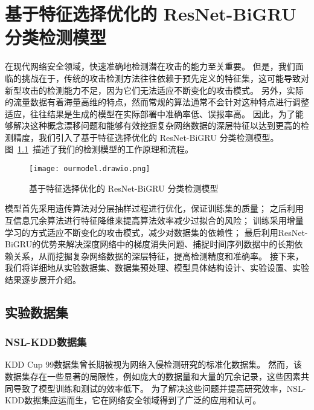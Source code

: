 \chapter{基于特征选择优化的 ResNet-BiGRU 分类检测模型}
\label{cha:ResNet-BiGRU}

在现代网络安全领域，快速准确地检测潜在攻击的能力至关重要。
但是，我们面临的挑战在于，传统的攻击检测方法往往依赖于预先定义的特征集，这可能导致对新型攻击的检测能力不足，因为它们无法适应不断变化的攻击模式。
另外，实际的流量数据有着海量高维的特点，然而常规的算法通常不会针对这种特点进行调整适应，往往结果是生成的模型在实际部署中准确率低、误报率高。
因此，为了能够解决这种概念漂移问题和能够有效挖掘复杂网络数据的深层特征以达到更高的检测精度，我们引入了基于特征选择优化的 ResNet-BiGRU 分类检测模型。
图~\ref{fig:attack_detecion_model}~描述了我们的检测模型的工作原理和流程。
\begin{figure}[htbp]
  \centering
  \texttt{[image: ourmodel.drawio.png]}
  \caption{基于特征选择优化的 ResNet-BiGRU 分类检测模型}
  \label{fig:attack_detecion_model}
\end{figure}


模型首先采用遗传算法对分层抽样过程进行优化，保证训练集的质量；
之后利用互信息冗余算法进行特征降维来提高算法效率减少过拟合的风险；
训练采用增量学习的方式适应不断变化的攻击模式，减少对数据集的依赖性；
最后利用ResNet-BiGRU的优势来解决深度网络中的梯度消失问题、捕捉时间序列数据中的长期依赖关系，从而挖掘复杂网络数据的深层特征，提高检测精度和准确率。
接下来，我们将详细地从实验数据集、数据集预处理、模型具体结构设计、实验设置、实验结果逐步展开介绍。

\section{实验数据集}
\subsection{NSL-KDD数据集\cite{revathi2013detailed}}
KDD Cup 99数据集\cite{tavallaee2009detailed}曾长期被视为网络入侵检测研究的标准化数据集。
然而，该数据集存在一些显著的局限性，例如庞大的数据量和大量的冗余记录，这些因素共同导致了模型训练和测试的效率低下。
为了解决这些问题并提高研究效率，NSL-KDD数据集应运而生，它在网络安全领域得到了广泛的应用和认可。


